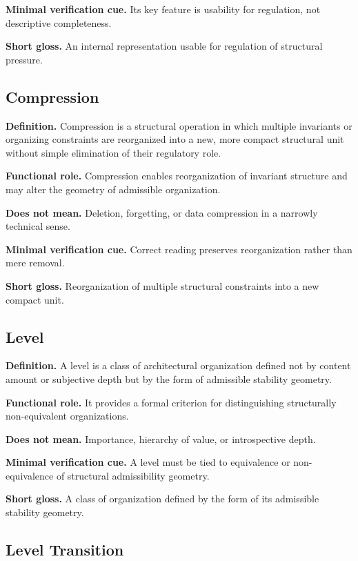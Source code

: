 \documentclass[11pt,a4paper]{article}
\begin{document}
	\textbf{Minimal verification cue.} Its key feature is usability for regulation, not descriptive completeness.
	
	\textbf{Short gloss.} An internal representation usable for regulation of structural pressure.
	
	\subsection{Compression}
	
	\textbf{Definition.} Compression is a structural operation in which multiple invariants or organizing constraints are reorganized into a new, more compact structural unit without simple elimination of their regulatory role.
	
	\textbf{Functional role.} Compression enables reorganization of invariant structure and may alter the geometry of admissible organization.
	
	\textbf{Does not mean.} Deletion, forgetting, or data compression in a narrowly technical sense.
	
	\textbf{Minimal verification cue.} Correct reading preserves reorganization rather than mere removal.
	
	\textbf{Short gloss.} Reorganization of multiple structural constraints into a new compact unit.
	
	\subsection{Level}
	
	\textbf{Definition.} A level is a class of architectural organization defined not by content amount or subjective depth but by the form of admissible stability geometry.
	
	\textbf{Functional role.} It provides a formal criterion for distinguishing structurally non-equivalent organizations.
	
	\textbf{Does not mean.} Importance, hierarchy of value, or introspective depth.
	
	\textbf{Minimal verification cue.} A level must be tied to equivalence or non-equivalence of structural admissibility geometry.
	
	\textbf{Short gloss.} A class of organization defined by the form of its admissible stability geometry.
	
	\subsection{Level Transition}
	
\end{document}
